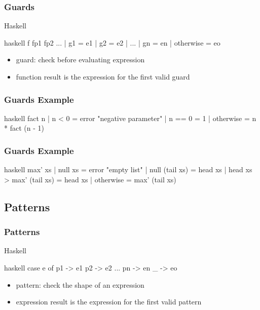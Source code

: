 \documentclass[dvipsnames]{beamer}
\theoremstyle{plain}
\begin{document}
\begin{frame}[fragile]
  \frametitle{Guards}

  \begin{block}{Haskell}
    \begin{pygments}{haskell}
f fp1 fp2 ...
  | g1 = e1
  | g2 = e2
  | ...
  | gn = en
  | otherwise = eo
    \end{pygments}
  \end{block}

  \begin{itemize}
    \item \alert{guard}: check before evaluating expression
    \item function result is the expression for the first valid guard
  \end{itemize}
\end{frame}

\begin{frame}[fragile]
  \frametitle{Guards Example}

  \begin{example}[factorial]
    \begin{pygments}{haskell}
fact n
  | n < 0 = error "negative parameter"
  | n == 0 = 1
  | otherwise = n * fact (n - 1)
    \end{pygments}
  \end{example}
\end{frame}

\begin{frame}[fragile]
  \frametitle{Guards Example}

  \begin{example}
    \pause
    \begin{pygments}{haskell}
max' xs
  | null xs = error "empty list"
  | null (tail xs) = head xs
  | head xs > max' (tail xs) = head xs
  | otherwise = max' (tail xs)
    \end{pygments}
  \end{example}
\end{frame}

\subsection{Patterns}

\begin{frame}[fragile]
  \frametitle{Patterns}

  \begin{block}{Haskell}
    \begin{pygments}{haskell}
case e of
  p1 -> e1
  p2 -> e2
  ...
  pn -> en
  _ -> eo
    \end{pygments}
  \end{block}

  \begin{itemize}
    \item \alert{pattern}: check the shape of an expression
    \item expression result is the expression for the first valid pattern
  \end{itemize}
\end{frame}
\end{document}
